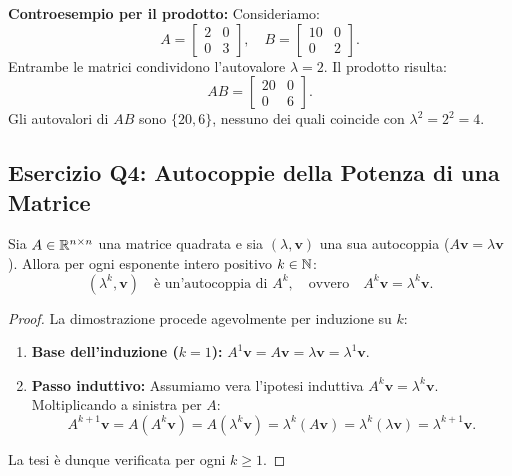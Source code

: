 \begin{example}
\medskip
\noindent\textbf{Controesempio per il prodotto:}
Consideriamo:
\begin{equation}
    A = \begin{bmatrix} 2 & 0 \\ 0 & 3 \end{bmatrix}, \quad B = \begin{bmatrix} 10 & 0 \\ 0 & 2 \end{bmatrix}.
\end{equation}
Entrambe le matrici condividono l'autovalore $\lambda = 2$. Il prodotto risulta:
\begin{equation}
    AB = \begin{bmatrix} 20 & 0 \\ 0 & 6 \end{bmatrix}.
\end{equation}
Gli autovalori di $AB$ sono $\{20, 6\}$, nessuno dei quali coincide con $\lambda^2 = 2^2 = 4$.
\end{example}

\subsection{Esercizio Q4: Autocoppie della Potenza di una Matrice}

\begin{theorem}
\label{thm:potenza-matrice}
Sia $A \in \mathbb{R}^{n \times n}$ una matrice quadrata e sia $(\lambda, \mathbf{v})$ una sua autocoppia ($A\mathbf{v} = \lambda \mathbf{v}$). Allora per ogni esponente intero positivo $k \in \mathbb{N}$:
\begin{equation}
    (\lambda^k, \mathbf{v}) \quad \text{\`e un'autocoppia di } A^k, \quad \text{ovvero} \quad A^k \mathbf{v} = \lambda^k \mathbf{v}.
\end{equation}
\end{theorem}

\begin{proof}
La dimostrazione procede agevolmente per induzione su $k$:
\begin{enumerate}
    \item \textbf{Base dell'induzione ($k=1$):} $A^1 \mathbf{v} = A\mathbf{v} = \lambda \mathbf{v} = \lambda^1 \mathbf{v}$.
    \item \textbf{Passo induttivo:} Assumiamo vera l'ipotesi induttiva $A^k \mathbf{v} = \lambda^k \mathbf{v}$. Moltiplicando a sinistra per $A$:
    \begin{equation}
        A^{k+1} \mathbf{v} = A(A^k \mathbf{v}) = A(\lambda^k \mathbf{v}) = \lambda^k (A\mathbf{v}) = \lambda^k (\lambda \mathbf{v}) = \lambda^{k+1} \mathbf{v}.
    \end{equation}
\end{enumerate}
La tesi \`e dunque verificata per ogni $k \ge 1$.
\end{proof}

